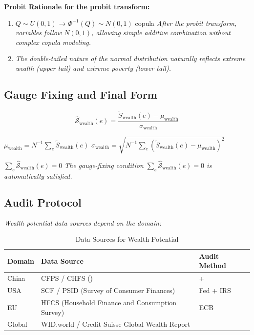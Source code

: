 \documentclass[11pt,a4paper]{article}
\theoremstyle{definition}
\newcommand{\Sopwealth}{\hat{\mathcal{S}}_{\text{wealth}}}
\begin{document}
\bigskip
\textbf{Probit Rationale for the probit transform:}

\begin{enumerate}[leftmargin=*]
    \item  $Q \sim U(0,1)$ → $\Phi^{-1}(Q) \sim N(0,1)$
    copula
    \textit{After the probit transform, variables follow $N(0,1)$, allowing simple additive combination without complex copula modeling.}
    
    \item 
    \textit{The double-tailed nature of the normal distribution naturally reflects extreme wealth (upper tail) and extreme poverty (lower tail).}
\end{enumerate}

\subsection{ Gauge Fixing and Final Form}


\begin{equation}
    \boxed{\Sopwealth(e) = \frac{\tilde{S}_{\text{wealth}}(e) - \mu_{\text{wealth}}}{\sigma_{\text{wealth}}}}
    \label{eq:wealth-final}
\end{equation}

 $\mu_{\text{wealth}} = N^{-1} \sum_e \tilde{S}_{\text{wealth}}(e)$
$\sigma_{\text{wealth}} = \sqrt{N^{-1} \sum_e (\tilde{S}_{\text{wealth}}(e) - \mu_{\text{wealth}})^2}$

\medskip
\noindent  $\sum_e \Sopwealth(e) = 0$ 
\textit{The gauge-fixing condition $\sum_e \Sopwealth(e) = 0$ is automatically satisfied.}

\subsection{ Audit Protocol}



\medskip
\noindent\textit{Wealth potential data sources depend on the domain:}

\begin{table}[htbp]
\centering
\caption{ Data Sources for Wealth Potential}
\label{tab:wealth-sources}
\begin{tabular}{@{}lll@{}}
\toprule
\textbf{ Domain} & \textbf{ Data Source} & \textbf{ Audit Method} \\
\midrule
 China & CFPS / CHFS () &  +  \\
 USA & SCF / PSID (Survey of Consumer Finances) & Fed + IRS \\
 EU & HFCS (Household Finance and Consumption Survey) & ECB \\
 Global & WID.world / Credit Suisse Global Wealth Report &  \\
\bottomrule
\end{tabular}
\end{table}
\end{document}
